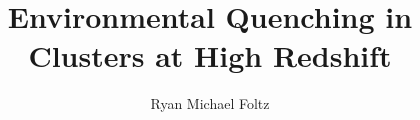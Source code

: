 \documentclass[oneside,final,letterpaper]{ucr}
\def\dsp{\def\baselinestretch{2.0}\large\normalsize} \dsp
\begin{document}
\title{Environmental Quenching in Clusters at High Redshift}
\author{Ryan Michael Foltz}

\maketitle
\copyrightpage{}
\approvalpage{}


\begin{frontmatter}







\tableofcontents
\newpage
\listoffigures
\newpage
\listoftables
\end{frontmatter}









\newpage


\newcommand\newblock{\hskip .11em\@plus.33em\@minus.07em}

\def\dsp{\def\baselinestretch{1.0}\large\normalsize} \dsp


\end{document}
